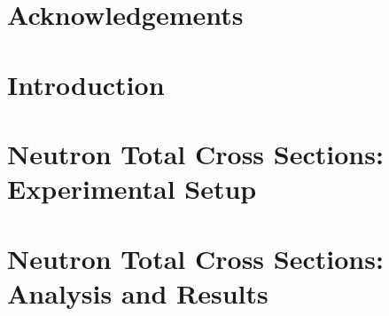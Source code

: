 \documentclass[12pt]{book} %
\newcommand\blankpage{%
    \null
    \thispagestyle{empty}%
    \addtocounter{page}{-1}%
\newpage}
\newcommand{\textDirectory}{text}
\begin{document}
\frontmatter



\begingroup
\let\cleardoublepage\clearpage
\tableofcontents
\endgroup

\fancyhead{}
\fancyhead[LO]{\MakeUppercase{\leftmark}}

\begingroup
\let\cleardoublepage\clearpage
{}
\listoffigures
\endgroup

\clearpage

\fancyhead{}
\fancyhead[LO]{\MakeUppercase{\leftmark}}

\begingroup
\let\cleardoublepage\clearpage
{}
\listoftables
\endgroup

\clearpage
{}
\fancyhead{}

\begingroup
\let\cleardoublepage\clearpage
\chapter*{Acknowledgements}

\endgroup



\afterpage{\blankpage}
\clearpage

\mainmatter

\fancyhead{} %
\fancyhead[LE]{\MakeUppercase{\rightmark}} %

\chapter{Introduction} \label{introduction}


\chapter{Neutron Total Cross Sections: Experimental Setup} \label{TCSExperiment}


\chapter{Neutron Total Cross Sections: Analysis and Results} \label{TCSAnalysis}

\end{document}

